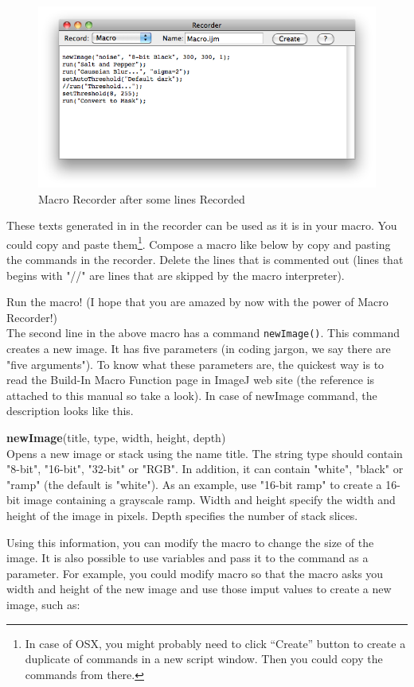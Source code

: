 \documentclass[11pt,a4paper,oneside]{report}
\newenvironment{indentCom}%
{\begin{list}{}%
         {\setlength{\leftmargin}{1em}}%
         \item[]%
}
{\end{list}}
\newcommand{\ilcom}[1]{\texttt{\small#1}}
\begin{document}
\begin{figure}[htbp]
\begin{center}
\includegraphics[scale=0.6]{fig/MacroRecorderFilled.png}
\caption{Macro Recorder after some lines Recorded} 
\label{fig_macroRecorderFilled}
\end{center}
\end{figure}

These texts generated in in the recorder can be used as it is in your macro. 
You could copy and paste them\footnote{In case of OSX, you might probably need
to click ``Create'' button to create a duplicate of commands in a new script
window. Then you could copy the commands from there.}. Compose a macro like
below by copy and pasting the commands in the recorder. 
Delete the lines that is commented out (lines that begins with "//" are lines that are skipped by the macro interpreter).


Run the macro! (I hope that you are amazed by now with the power of Macro
Recorder!)\\
 
The second line in the above macro has a command \ilcom{newImage()}. This
command creates a new image. It has five parameters (in coding jargon, we say
there are "five arguments"). To know what these parameters are, 
the quickest way is to read the Build-In Macro Function page in ImageJ web site  
(the reference is attached to this manual so take a look).  
In case of newImage command, the description looks like this. 

\begin{indentCom}
\textbf{newImage}(title, type, width, height, depth)\\
Opens a new image or stack using the name title. 
The string type should contain "8-bit", "16-bit", "32-bit" or "RGB". 
In addition, it can contain "white", "black" or "ramp" (the default is "white"). 
As an example, use "16-bit ramp" to create a 16-bit image containing a grayscale ramp. 
Width and height specify the width and height of the image in pixels. 
Depth specifies the number of stack slices.
\end{indentCom}
Using this information, you can modify the macro to change the size of the image. 
It is also possible to use variables and pass it to the command as a parameter. 
For example, you could modify macro so that the macro asks you width and height
of the new image and use those imput values to create a new image, such as:

\end{document}
